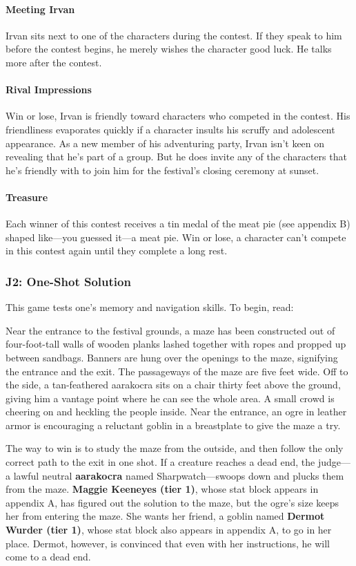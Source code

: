 \documentclass[10pt,a4,twoside,twocolumn,openany,nodeprecatedcode]{dndbook}
\begin{document}
\paragraph{Meeting Irvan}
Irvan sits next to one of the characters during the contest. If they speak to him before the contest begins, he merely wishes the character good luck. He talks more after the contest.
\paragraph{Rival Impressions}
Win or lose, Irvan is friendly toward characters who competed in the contest. His friendliness evaporates quickly if a character insults his scruffy and adolescent appearance.
As a new member of his adventuring party, Irvan isn't keen on revealing that he's part of a group. But he does invite any of the characters that he's friendly with to join him for the festival's closing ceremony at sunset.
\paragraph{Treasure}
Each winner of this contest receives a tin medal of the meat pie (see appendix B) shaped like—you guessed it—a meat pie.
Win or lose, a character can't compete in this contest again until they complete a long rest.
\subsubsection{J2: One-Shot Solution}
This game tests one's memory and navigation skills. To begin, read:
\begin{DndReadAloud}{}
Near the entrance to the festival grounds, a maze has been constructed out of four-foot-tall walls of wooden planks lashed together with ropes and propped up between sandbags. Banners are hung over the openings to the maze, signifying the entrance and the exit. The passageways of the maze are five feet wide. Off to the side, a tan-feathered aarakocra sits on a chair thirty feet above the ground, giving him a vantage point where he can see the whole area.
A small crowd is cheering on and heckling the people inside. Near the entrance, an ogre in leather armor is encouraging a reluctant goblin in a breastplate to give the maze a try.
\end{DndReadAloud}

The way to win is to study the maze from the outside, and then follow the only correct path to the exit in one shot. If a creature reaches a dead end, the judge—a lawful neutral \textbf{aarakocra} named Sharpwatch—swoops down and plucks them from the maze.
\textbf{Maggie Keeneyes (tier 1)}, whose stat block appears in appendix A, has figured out the solution to the maze, but the ogre's size keeps her from entering the maze. She wants her friend, a goblin named \textbf{Dermot Wurder (tier 1)}, whose stat block also appears in appendix A, to go in her place. Dermot, however, is convinced that even with her instructions, he will come to a dead end.
\end{document}
